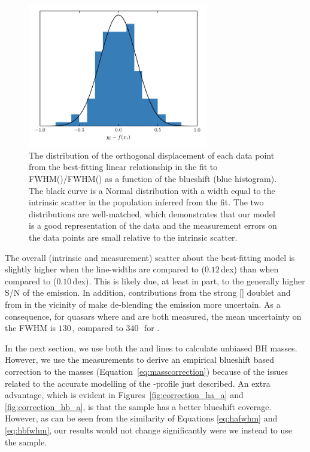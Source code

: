 \begin{figure}[t!]
    \centering
    \includegraphics[width=0.7\textwidth]{figures/chapter03/intrinsic_scatter.pdf}
    \caption[{The distribution of the orthogonal displacement of each data point from the best-fitting linear relationship in the fit to FWHM()/FWHM(\hans) as a function of the  blueshift.}]{The distribution of the orthogonal displacement of each data point from the best-fitting linear relationship in the fit to FWHM()/FWHM(\hans) as a function of the  blueshift (blue histogram). The black curve is a Normal distribution with a width equal to the intrinsic scatter in the population inferred from the fit. The two distributions are well-matched, which demonstrates that our model is a good representation of the data and the measurement errors on the data points are small relative to the intrinsic scatter.}
    \label{fig:intrinsic_scatter}
\end{figure}

The overall (intrinsic and measurement) scatter about the best-fitting model is slightly higher when the  line-widths are compared to \hb ($0.12$\,dex) than when compared to \ha ($0.10$\,dex).
This is likely due, at least in part, to the generally higher S/N of the \ha emission.
In addition, contributions from the strong [] doublet and from  in the vicinity of \hb make de-blending the \hb emission more uncertain.
As a consequence, for quasars where \ha and \hb are both measured, the mean uncertainty on the \ha FWHM is $130$\,\kms, compared to $340$\,\kms\, for \hbns.

In the next section, we use both the \ha and \hb lines to calculate unbiased BH masses.
However, we use the \ha measurements to derive an empirical  blueshift based correction to the  masses (Equation~\ref{eq:masscorrection}) because of the issues related to the accurate modelling of the \hbns-profile just described.
An extra advantage, which is evident in Figures~\ref{fig:correction_ha_a} and \ref{fig:correction_hb_a}, is that the \ha sample has a better  blueshift coverage.
However, as can be seen from the similarity of Equations \ref{eq:hafwhm} and \ref{eq:hbfwhm}, our results would not change significantly were we instead to use the \hb sample.


